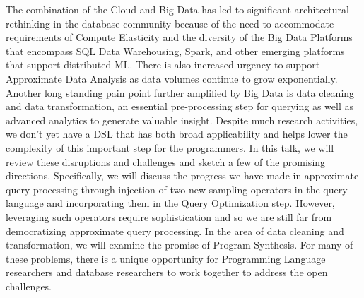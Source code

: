 \documentclass[a4paper,UKenglish]{dagrep-v2018}
\begin{document}

\license

The combination of the Cloud and Big Data has led to significant architectural rethinking in the database community because of the need to accommodate requirements of Compute Elasticity and the diversity of the Big Data Platforms that encompass SQL Data Warehousing, Spark, and other emerging platforms that support distributed ML. There is also increased urgency to support Approximate Data Analysis as data volumes continue to grow exponentially. Another long standing pain point further amplified by Big Data is data cleaning and data transformation, an essential pre-processing step for querying as well as advanced analytics to generate valuable insight. Despite much research activities, we don’t yet have a DSL that has both broad applicability and helps lower the complexity of this important step for the programmers.  In this talk, we will review these disruptions and challenges and sketch a few of the promising directions. Specifically, we will discuss the progress we have made in approximate query processing through injection of two new sampling operators in the query language and incorporating them in the Query Optimization step.  However, leveraging such operators require sophistication and so we are still far from democratizing approximate query processing. In the area of data cleaning and transformation, we will examine the promise of Program Synthesis. For many of these problems, there is a unique opportunity for Programming Language researchers and database researchers to work together to address the open challenges.


\license
\end{document}
